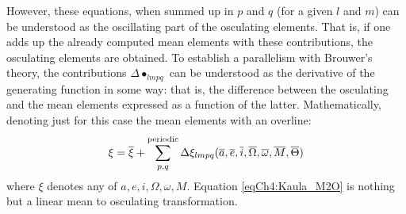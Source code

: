 				\indent However, these equations, when summed up in $p$ and $q$ (for a given $l$ and $m$) can be understood as the oscillating part of the osculating elements. That is, if one adds up the already computed mean elements with these contributions, the osculating elements are obtained. To establish a parallelism with Brouwer's theory, the contributions $\Delta \bullet _{lmpq}$ can be understood as the derivative of the generating function in some way: that is, the difference between the osculating and the mean elements expressed as a function of the latter. Mathematically, denoting just for this case the mean elements with an overline:\\
				\begin{equation}
				\xi = \overline{\xi} + \displaystyle\sum_{p, q}^{\text{periodic}} \Delta \xi_{lmpq} (\overline{a}, \overline{e}, \overline{i}, \overline{\Omega}, \overline{\omega}, \overline{M}, \overline{\Theta})
				\label{eqCh4:Kaula_M2O}
				\end{equation}
				\noindent where $\xi$ denotes any of $a, e, i, \Omega, \omega, M$. Equation \eqref{eqCh4:Kaula_M2O} is nothing but a linear mean to osculating transformation. 
